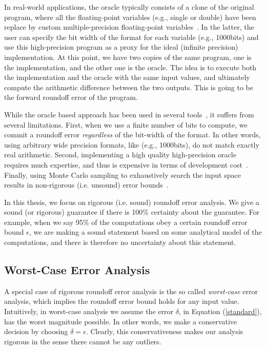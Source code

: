 In real-world applications, the oracle typically consists of a clone of the original program, where all the floating-point variables (e.g., single or double) have been replace by custom multiple-precision floating-point variables~\cite{mpfr}.
%
In the latter, the user can specify the bit width of the format for each variable (e.g., 1000bits) and use this high-precision program as a proxy for the ideal (infinite precision) implementation.
%
At this point, we have two copies of the same program, one is the implementation, and the other one is the oracle. 
%
The idea is to execute both the implementation and the oracle with the same input values, and ultimately compute the arithmetic difference between the two outputs. 
%
This is going to be the forward roundoff error of the program. 
%

While the oracle based approach has been used in several tools~\cite{landau2014guide, kahan1996improbability, atomic, blame, herbie}, it suffers from several limitations.
%
First, when we use a finite number of bits to compute, we commit a roundoff error \emph{regardless} of the bit-width of the format.
%
In other words, using arbitrary wide precision formats, like (e.g., 1000bits), do not match exactly real arithmetic.
%
Second, implementing a high quality high-precision oracle requires much expertise, and thus is expensive in terms of development cost~\cite{atomic}.
%
Finally, using Monte Carlo sampling to exhaustively search the input space results in non-rigorous (i.e. unsound) error bounds~\cite{glasserman2013monte, parker2000monte}.
%

In this thesis, we focus on rigorous (i.e. sound) roundoff error analysis.
%
We give a sound (or rigorous) guarantee if there is 100\% certainty about the guarantee.
%
%
For example, when we say 95\% of the computations obey a certain roundoff error bound $\epsilon$, we are making a sound statement based on some analytical model of the computations, and there is therefore no uncertainty about this statement.
%
%
\subsection{Worst-Case Error Analysis}
\label{sec:worst}
%
A special case of rigorous roundoff error analysis is the so called \emph{worst-case} error analysis, which implies the roundoff error bound holds for any input value.
%
Intuitively, in worst-case analysis we assume the error $\delta$, in Equation (\ref{standard}), has the worst magnitude possible. In other words, we make a conservative decision by choosing $\delta=\epsilon$.
%
Clearly, this conservativeness makes our analysis rigorous in the sense there cannot be any outliers.
%

